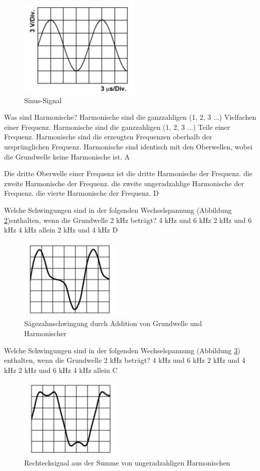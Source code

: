 \begin{figure}[H]
\centering
\includegraphics[scale=0.6]{Signale/Bilder/TB603.png}
\caption{Sinus-Signal}
\label{sinus}
\end{figure}

{Was sind Harmonische?}%
{Harmonische sind die ganzzahligen (1, 2, 3 ...) Vielfachen einer Frequenz.}%
{Harmonische sind die ganzzahligen (1, 2, 3 ...) Teile einer Frequenz.}%
{Harmonische sind die erzeugten Frequenzen oberhalb der ursprünglichen Frequenz.}%
{Harmonische sind identisch mit den Oberwellen, wobei die Grundwelle keine Harmonische ist.}%
{A}%

{Die dritte Oberwelle einer Frequenz ist}%
{die dritte Harmonische der Frequenz.
}%
{die zweite Harmonische der Frequenz.}%
{die zweite ungeradzahlige Harmonische der Frequenz.}%
{die vierte Harmonische der Frequenz.}%
{D}%

{Welche Schwingungen sind in der folgenden Wechselspannung (Abbildung \ref{TB705})enthalten, wenn die Grundwelle 2 kHz beträgt?}%
{4 kHz und 6 kHz}%
{2 kHz und 6 kHz}%
{4 kHz allein}%
{2 kHz und 4 kHz}%
{D}%

\begin{figure}[H]
\centering
\includegraphics[scale=0.6]{Signale/Bilder/TB705.png}
\caption{Sägezahnschwingung durch Addition von Grundwelle und Harmonischer}
\label{TB705}
\end{figure}

{ Welche Schwingungen sind in der folgenden Wechselspannung (Abbildung \ref{TB706}) enthalten, wenn die Grundwelle 2 kHz beträgt? }%
{4 kHz und 6 kHz}%
{2 kHz und 4 kHz}%
{2 kHz und 6 kHz}%
{4 kHz allein}%
{C}%

\begin{figure}[H]
\centering
\includegraphics[scale=0.6]{Signale/Bilder/TB706.png}
\caption{Rechtecksignal aus der Summe von ungeradzahligen Harmonischen}
\label{TB706}
\end{figure}